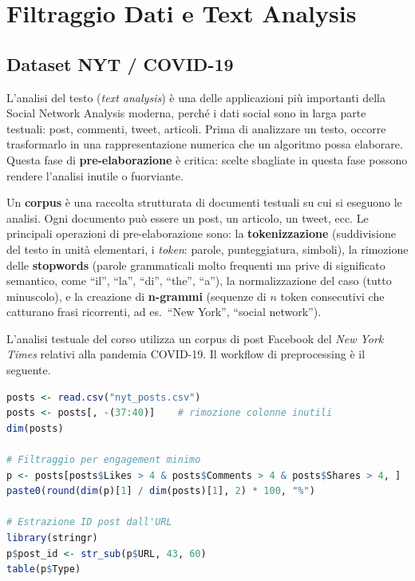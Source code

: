 \documentclass[12pt,a4paper]{article}
\begin{document}
\section{Filtraggio Dati e Text Analysis}

\subsection{Dataset NYT / COVID-19}

L'analisi del testo (\textit{text analysis}) è una delle applicazioni più importanti
della Social Network Analysis moderna, perché i dati social sono in larga parte testuali:
post, commenti, tweet, articoli. Prima di analizzare un testo, occorre trasformarlo in
una rappresentazione numerica che un algoritmo possa elaborare. Questa fase di
\textbf{pre-elaborazione} è critica: scelte sbagliate in questa fase possono rendere
l'analisi inutile o fuorviante.

Un \textbf{corpus} è una raccolta strutturata di documenti testuali su cui si eseguono
le analisi. Ogni documento può essere un post, un articolo, un tweet, ecc. Le principali
operazioni di pre-elaborazione sono: la \textbf{tokenizzazione} (suddivisione del testo
in unità elementari, i \emph{token}: parole, punteggiatura, simboli), la rimozione delle
\textbf{stopwords} (parole grammaticali molto frequenti ma prive di significato semantico,
come ``il'', ``la'', ``di'', ``the'', ``a''), la normalizzazione del caso (tutto minuscolo),
e la creazione di \textbf{n-grammi} (sequenze di $n$ token consecutivi che catturano
frasi ricorrenti, ad es.\ ``New York'', ``social network'').

L'analisi testuale del corso utilizza un corpus di post Facebook del \textit{New York Times}
relativi alla pandemia COVID-19. Il workflow di preprocessing è il seguente.

\begin{lstlisting}[language=R]
posts <- read.csv("nyt_posts.csv")
posts <- posts[, -(37:40)]    # rimozione colonne inutili
dim(posts)

# Filtraggio per engagement minimo
p <- posts[posts$Likes > 4 & posts$Comments > 4 & posts$Shares > 4, ]
paste0(round(dim(p)[1] / dim(posts)[1], 2) * 100, "%")

# Estrazione ID post dall'URL
library(stringr)
p$post_id <- str_sub(p$URL, 43, 60)
table(p$Type)
\end{lstlisting}
\end{document}
